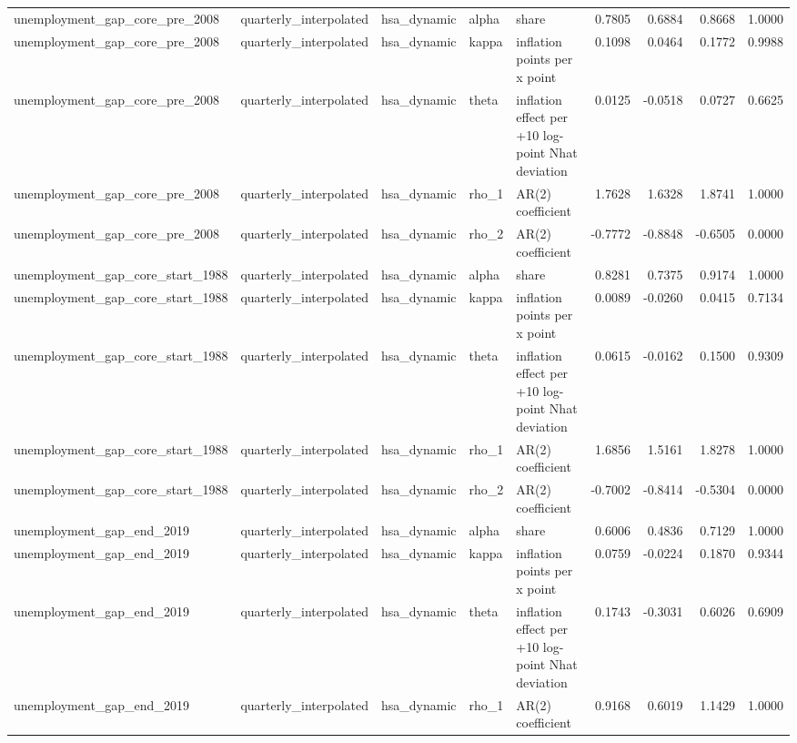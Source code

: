 \begin{tabular}{lllllrrrr}
unemployment\_gap\_core\_pre\_2008 & quarterly\_interpolated & hsa\_dynamic & alpha & share & 0.7805 & 0.6884 & 0.8668 & 1.0000 \\
unemployment\_gap\_core\_pre\_2008 & quarterly\_interpolated & hsa\_dynamic & kappa & inflation points per x point & 0.1098 & 0.0464 & 0.1772 & 0.9988 \\
unemployment\_gap\_core\_pre\_2008 & quarterly\_interpolated & hsa\_dynamic & theta & inflation effect per +10 log-point Nhat deviation & 0.0125 & -0.0518 & 0.0727 & 0.6625 \\
unemployment\_gap\_core\_pre\_2008 & quarterly\_interpolated & hsa\_dynamic & rho\_1 & AR(2) coefficient & 1.7628 & 1.6328 & 1.8741 & 1.0000 \\
unemployment\_gap\_core\_pre\_2008 & quarterly\_interpolated & hsa\_dynamic & rho\_2 & AR(2) coefficient & -0.7772 & -0.8848 & -0.6505 & 0.0000 \\
unemployment\_gap\_core\_start\_1988 & quarterly\_interpolated & hsa\_dynamic & alpha & share & 0.8281 & 0.7375 & 0.9174 & 1.0000 \\
unemployment\_gap\_core\_start\_1988 & quarterly\_interpolated & hsa\_dynamic & kappa & inflation points per x point & 0.0089 & -0.0260 & 0.0415 & 0.7134 \\
unemployment\_gap\_core\_start\_1988 & quarterly\_interpolated & hsa\_dynamic & theta & inflation effect per +10 log-point Nhat deviation & 0.0615 & -0.0162 & 0.1500 & 0.9309 \\
unemployment\_gap\_core\_start\_1988 & quarterly\_interpolated & hsa\_dynamic & rho\_1 & AR(2) coefficient & 1.6856 & 1.5161 & 1.8278 & 1.0000 \\
unemployment\_gap\_core\_start\_1988 & quarterly\_interpolated & hsa\_dynamic & rho\_2 & AR(2) coefficient & -0.7002 & -0.8414 & -0.5304 & 0.0000 \\
unemployment\_gap\_end\_2019 & quarterly\_interpolated & hsa\_dynamic & alpha & share & 0.6006 & 0.4836 & 0.7129 & 1.0000 \\
unemployment\_gap\_end\_2019 & quarterly\_interpolated & hsa\_dynamic & kappa & inflation points per x point & 0.0759 & -0.0224 & 0.1870 & 0.9344 \\
unemployment\_gap\_end\_2019 & quarterly\_interpolated & hsa\_dynamic & theta & inflation effect per +10 log-point Nhat deviation & 0.1743 & -0.3031 & 0.6026 & 0.6909 \\
unemployment\_gap\_end\_2019 & quarterly\_interpolated & hsa\_dynamic & rho\_1 & AR(2) coefficient & 0.9168 & 0.6019 & 1.1429 & 1.0000 \\

\end{tabular}
